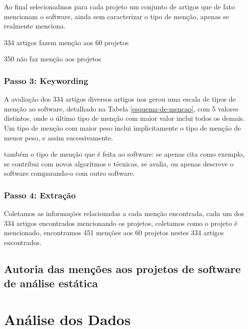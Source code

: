 Ao final selecionadmos para cada projeto um conjunto de artigos que de fato
mencionam o software, ainda sem caracterizar o tipo de menção, apenas se
realmente menciona.

334 artigos fazem menção aos 60 projetos

350 não faz menção aos projetos

\subsubsection{Passo 3: Keywording}

A avaliação dos 334 artigos diversos artigos nos gerou uma escala de tipos de menção ao
software, detalhado na Tabela \ref{esquema-de-mencao}, com 5 valores
distintos, onde o último tipo de menção com maior valor inclui todos os demais.
Um tipo de menção com maior peso inclui implicitamente o tipo de
menção de menor peso, e assim sucessivamente.

também o tipo de menção que é feita ao software: se apenas cita como exemplo,
se contribui com novos algoritmos e técnicas, se avalia, ou apenas descreve o
software comparando-o com outro software.

\subsubsection{Passo 4: Extração}

Coletamos as informações relacionadas a cada menção encontrada, cada um dos 334
artigos encontrados mencionando os projetos, coletamos como o projeto é
mencionado, encontramos 451 menções aos 60 projetos nestes 334 artigos
encontrados.

% 
% 
% 
% 



\subsection{Autoria das menções aos projetos de software de análise estática}



\section{Análise dos Dados} %


